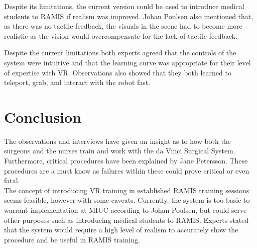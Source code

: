 Despite its limitations, the current version could be used to introduce medical students to RAMIS if realism was improved. Johan Poulsen also mentioned that, as there was no tactile feedback, the visuals in the scene had to become more realistic as the vision would overcompensate for the lack of tactile feedback. 

Despite the current limitations both experts agreed that the controls of the system were intuitive and that the learning curve was appropriate for their level of expertise with VR. Observations also showed that they both learned to teleport, grab, and interact with the robot fast.


\section{Conclusion}
The observations and interviews have given an insight as to how both the surgeons and the nurses train and work with the da Vinci Surgical System. Furthermore, critical procedures have been explained by Jane Petersson. These procedures are a must know as failures within these could prove critical or even fatal.\\

The concept of introducing VR training in established RAMIS training sessions seems feasible, however with some caveats. Currently, the system is too basic to warrant implementation at MIUC according to Johan Poulsen, but could serve other purposes such as introducing medical students to RAMIS. Experts stated that the system would require a high level of realism to accurately show the procedure and be useful in RAMIS training.




\newpage
\appendix
%